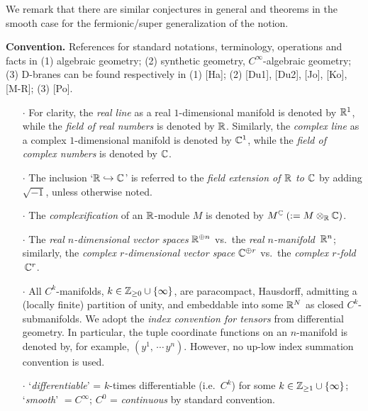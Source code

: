 \documentclass[11pt]{article}
\numberwithin{equation}{subsection}
\begin{document}
 We remark that there are similar conjectures in general and theorems in the smooth case
   for the fermionic/super generalization of the notion.




\bigskip

\bigskip

\noindent
{\bf Convention.}
 References for standard notations, terminology, operations and facts in
    (1) algebraic geometry;
    (2) synthetic geometry, $C^{\infty}$-algebraic geometry;
    (3) D-branes
 can be found respectively in
    (1) [Ha];
    (2) [Du1], [Du2], [Jo], [Ko], [M-R];
    (3) [Po].
 \begin{itemize}
  \item[$\cdot$]
   For clarity, the {\it real line} as a real $1$-dimensional manifold is denoted by ${\Bbb R}^1$,
    while the {\it field of real numbers} is denoted by ${\Bbb R}$.
   Similarly, the {\it complex line} as a complex $1$-dimensional manifold is denoted by ${\Bbb C}^1$,
    while the {\it field of complex numbers} is denoted by ${\Bbb C}$.
	
  \item[$\cdot$]	
  The inclusion `${\Bbb R}\hookrightarrow{\Bbb C}$' is referred to the {\it field extension
   of ${\Bbb R}$ to ${\Bbb C}$} by adding $\sqrt{-1}$, unless otherwise noted.

  \item[$\cdot$]
   The {\it complexification} of an ${\Bbb R}$-module $M$ is denoted by
    $M^{\Bbb C}\;(:= M\otimes_{\Bbb R}{\Bbb C})$.

 \item[$\cdot$]	
  The {\it real $n$-dimensional vector spaces} ${\Bbb R}^{\oplus n}$
      vs.\ the {\it real $n$-manifold} $\,{\Bbb R}^n$; \\
  similarly, the {\it complex $r$-dimensional vector space ${\Bbb C}^{\oplus r}$}
     vs.\ the {\it complex $r$-fold} $\,{\Bbb C}^r$.

 \item[$\cdot$]
  All $C^k$-manifolds, $k\in{\Bbb Z}_{\ge 0}\cup\{\infty\}$,
     are paracompact, Hausdorff, admitting a (locally finite) partition of unity,
     and embeddable into some ${\Bbb R}^N$ as closed $C^k$-submanifolds.
  We adopt the {\it index convention for tensors} from differential geometry.
   In particular, the tuple coordinate functions on an $n$-manifold is denoted by, for example,
   $(y^1,\,\cdots\,y^n)$.
  However, no up-low index summation convention is used.

  \item[$\cdot$]
   `{\it differentiable}' = $k$-times differentiable (i.e.\ $C^k$)
         for some $k\in{\Bbb Z}_{\ge 1}\cup\{\infty\}$;
   `{\it smooth}' $=C^{\infty}$;
   $C^0$ = {\it continuous} by standard convention.


\end{itemize}
\end{document}
